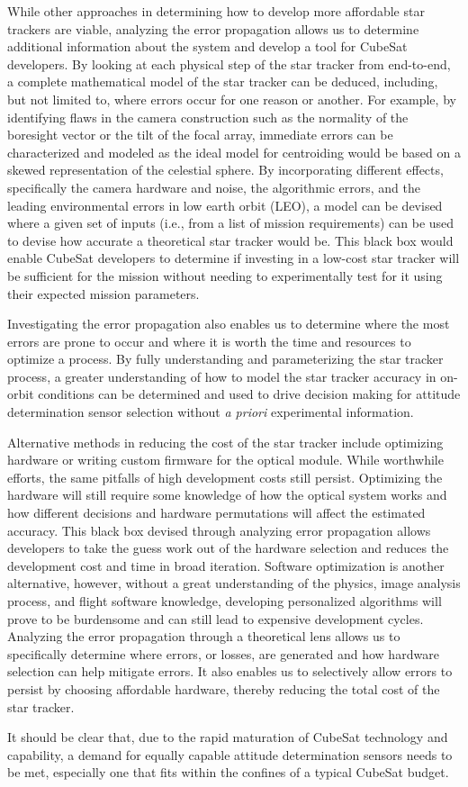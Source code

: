 \par \qquad While other approaches in determining how to develop more affordable star trackers are viable, analyzing the error propagation allows us to determine additional information about the system and develop a tool for CubeSat developers.
By looking at each physical step of the star tracker from end-to-end, a complete mathematical model of the star tracker can be deduced, including, but not limited to, where errors occur for one reason or another.
For example, by identifying flaws in the camera construction such as the normality of the boresight vector or the tilt of the focal array, immediate errors can be characterized and modeled as the ideal model for centroiding would be based on a skewed representation of the celestial sphere.
By incorporating different effects, specifically the camera hardware and noise, the algorithmic errors, and the leading environmental errors in low earth orbit (LEO), a model can be devised where a given set of inputs (i.e., from a list of mission requirements) can be used to devise how accurate a theoretical star tracker would be.
This black box would enable CubeSat developers to determine if investing in a low-cost star tracker will be sufficient for the mission without needing to experimentally test for it using their expected mission parameters.

\par \qquad Investigating the error propagation also enables us to determine where the most errors are prone to occur and where it is worth the time and resources to optimize a process. 
By fully understanding and parameterizing the star tracker process, a greater understanding of how to model the star tracker accuracy in on-orbit conditions can be determined and used to drive decision making for attitude determination sensor selection without \emph{a priori} experimental information.

\par \qquad Alternative methods in reducing the cost of the star tracker include optimizing hardware or writing custom firmware for the optical module.
While worthwhile efforts, the same pitfalls of high development costs still persist.
Optimizing the hardware will still require some knowledge of how the optical system works and how different decisions and hardware permutations will affect the estimated accuracy.
This black box devised through analyzing error propagation allows developers to take the guess work out of the hardware selection and reduces the development cost and time in broad iteration.
Software optimization is another alternative, however, without a great understanding of the physics, image analysis process, and flight software knowledge, developing personalized algorithms will prove to be burdensome and can still lead to expensive development cycles.
Analyzing the error propagation through a theoretical lens allows us to specifically determine where errors, or losses, are generated and how hardware selection can help mitigate errors. 
It also enables us to selectively allow errors to persist by choosing affordable hardware, thereby reducing the total cost of the star tracker.

\par \qquad It should be clear that, due to the rapid maturation of CubeSat technology and capability, a demand for equally capable attitude determination sensors needs to be met, especially one that fits within the confines of a typical CubeSat budget.